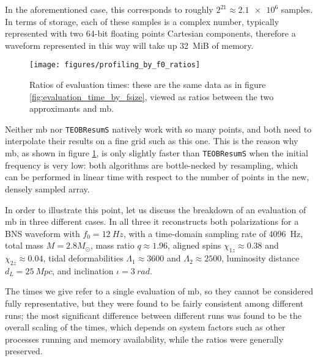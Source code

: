 \documentclass[main.tex]{subfiles}
\begin{document}
In the aforementioned case, this corresponds to roughly \(2^{21} \approx \num{2.1e6}\) samples. In terms of storage, each of these samples is a complex number, typically represented with two 64-bit floating points Cartesian components, therefore a waveform represented in this way will take up \SI{32}{MiB} of memory.

\begin{figure}[ht]
\centering
\texttt{[image: figures/profiling\_by\_f0\_ratios]}
\caption{Ratios of evaluation times: these are the same data as in figure \ref{fig:evaluation_time_by_fsize}, viewed as ratios between the two approximants and \ac{mb}. }
\label{fig:profiling_by_f0_ratios}
\end{figure}

Neither \ac{mb} nor \texttt{TEOBResumS} natively work with so many points, and both need to interpolate their results on a fine grid such as this one. 
This is the reason why \ac{mb}, as shown in figure \ref{fig:profiling_by_f0_ratios}, is only slightly faster than \texttt{TEOBResumS} when the initial frequency is very low: both algorithms are bottle-necked by resampling, which can be performed in linear time with respect to the number of points in the new, densely sampled array. 

In order to illustrate this point, let us discuss the breakdown of an evaluation of \ac{mb} in three different cases.
In all three it reconstructs both polarizations for a \ac{BNS} waveform with \(f_0 = \SI{12}{Hz}\), with a time-domain sampling rate of \SI{4096}{Hz}, total mass \(M = 2.8M_{\odot}\), mass ratio \(q \approx 1.96\), aligned spins \(\chi_{1z} \approx 0.38\) and \(\chi_{2z} \approx 0.04\), tidal deformabilities \(\Lambda_1 \approx 3600 \) and \(\Lambda_2 \approx 2500\), luminosity distance \(d_L = \SI{25}{Mpc}\), and inclination \(\iota = \SI{3}{rad}\).

The times we give refer to a single evaluation of \ac{mb}, so they cannot be considered fully representative, but they were found to be fairly consistent among different runs; the most significant difference between different runs was found to be the overall scaling of the times, which depends on system factors such as other processes running and memory availability, while the ratios were generally preserved.
\end{document}
